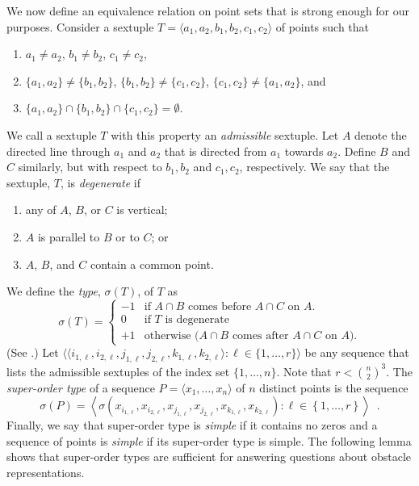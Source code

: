\documentclass{patmorin}
\begin{document}
We now define an equivalence relation on point sets that is
strong enough for our purposes.  Consider a sextuple $T=\langle
a_1,a_2,b_1,b_2,c_1,c_2\rangle$ of points such that
\begin{enumerate}
  \item  $a_1\neq a_2$, $b_1\neq b_2$, $c_1\neq c_2$, 
  \item  $\{a_1,a_2\}\neq \{b_1,b_2\}$, 
$\{b_1,b_2\}\neq \{c_1,c_2\}$, $\{c_1,c_2\}\neq \{a_1,a_2\}$, and 
  \item $\{a_1,a_2\}\cap\{b_1,b_2\}\cap\{c_1,c_2\}=\emptyset$.
\end{enumerate}
We call a sextuple $T$ with this property an \emph{admissible} sextuple.
Let $A$ denote the directed line through $a_1$ and $a_2$ that is directed
from $a_1$ towards $a_2$. Define $B$ and $C$ similarly, but with respect
to $b_1,b_2$ and $c_1,c_2$, respectively.  We say that the sextuple,
$T$, is \emph{degenerate} if
\begin{enumerate}
  \item any of $A$, $B$, or $C$ is vertical;
  \item $A$ is parallel to $B$ or to $C$; or
  \item $A$, $B$, and $C$ contain a common point.
\end{enumerate}
We define the \emph{type}, $\sigma(T)$, of $T$ as
\[
    \sigma(T) = \left\{\begin{array}{rl}
      -1 & \text{if $A\cap B$ comes before $A\cap C$ on $A$.} \\
      0 & \text{if $T$ is degenerate} \\
      +1 & \text{otherwise ($A\cap B$ comes after $A\cap C$ on $A$).} 
    \end{array}\right.
\]
(See .)  Let $\langle\langle
i_{1,\ell},i_{2,\ell},j_{1,\ell},j_{2,\ell},k_{1,\ell},k_{2,\ell}\rangle:
\ell \in \{1,\ldots,r\}\rangle$ be any sequence that lists the
admissible sextuples of the index set $\{1,\ldots,n\}$.  Note that $r<
\binom{n}{2}^3$.  The \emph{super-order type} of a sequence $P=\langle
x_1,\ldots,x_n\rangle$ of $n$ distinct points is the sequence
\[
   \sigma(P) = \left\langle \sigma\left(x_{i_{1,\ell}},x_{i_{2,\ell}},
       x_{j_{1,\ell}},x_{j_{2,\ell}},
       x_{k_{1,\ell}},x_{k_{2,\ell}}\right) : \ell\in\left\{1,\ldots,r\right\} \right\rangle \enspace .
\]
Finally, we say that super-order type is \emph{simple} if it contains
no zeros and a sequence of points is \emph{simple} if its super-order
type is simple.
The following lemma shows that super-order types are sufficient for answering
questions about obstacle representations.
\end{document}
